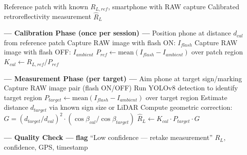 \documentclass[11pt,a4paper]{article}
\begin{document}
\begin{algorithm}[H]
\caption{Smartphone Retroreflectivity Calibration and Measurement}
\label{alg:calibration}
\begin{algorithmic}[1]
\Require Reference patch with known $R_{L,ref}$, smartphone with RAW capture
\Ensure Calibrated retroreflectivity measurement $\hat{R}_L$

\Statex \textbf{--- Calibration Phase (once per session) ---}
\State Position phone at distance $d_{cal}$ from reference patch
\State Capture RAW image with flash ON: $I_{flash}$
\State Capture RAW image with flash OFF: $I_{ambient}$
\State $P_{ref} \gets \text{mean}(I_{flash} - I_{ambient})$ over patch region
\State $K_{cal} \gets R_{L,ref} / P_{ref}$ 

\Statex
\Statex \textbf{--- Measurement Phase (per target) ---}
\State Aim phone at target sign/marking
\State Capture RAW image pair (flash ON/OFF)
\State Run YOLOv8 detection to identify target region
\State $P_{target} \gets \text{mean}(I_{flash} - I_{ambient})$ over target region
\State Estimate distance $d_{target}$ via known sign size or LiDAR
\State Compute geometric correction: $G = (d_{target}/d_{cal})^2 \cdot (\cos\beta_{cal}/\cos\beta_{target})$
\State $\hat{R}_L \gets K_{cal} \cdot P_{target} \cdot G$

\Statex
\Statex \textbf{--- Quality Check ---}
    \State \textbf{flag} ``Low confidence --- retake measurement''
\EndIf
\State \Return $\hat{R}_L$, confidence, GPS, timestamp
\end{algorithmic}
\end{algorithm}
\end{document}
